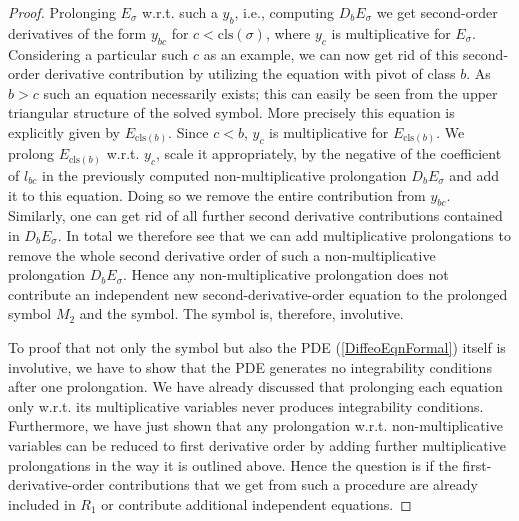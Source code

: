 \begin{proof}
Prolonging $E_{\sigma}$ w.r.t. such a $y_b$, i.e., computing $D_bE_{\sigma}$ we get second-order derivatives of the form $y_{bc}$ for $c < \mathrm{cls}(\sigma)$, where $y_c$ is multiplicative for $E_{\sigma}$. Considering a particular such $c$ as an example, we can now get rid of this second-order derivative contribution by utilizing the equation with pivot of class $b$. As $b>c$ such an equation necessarily exists; this can easily be seen from the upper triangular structure of the solved symbol. More precisely this equation is explicitly given by $E_{\mathrm{cls}(b)}$.
Since $c<b$, $y_c$ is multiplicative for $E_{\mathrm{cls}(b)}$. We prolong $E_{\mathrm{cls}(b)}$ w.r.t. $y_c$, scale it appropriately, by the negative of the coefficient of $l_{bc}$ in the previously computed non-multiplicative prolongation $D_bE_{\sigma}$ and add it to this equation. Doing so we remove the entire contribution from $y_{bc}$. Similarly, one can get rid of all further second derivative contributions contained in $D_bE_{\sigma}$. In total we therefore see that we can add multiplicative prolongations to remove the whole second derivative order of such a non-multiplicative prolongation $D_bE_{\sigma}$.
Hence any non-multiplicative prolongation does not contribute an independent new second-derivative-order equation to the prolonged symbol $M_2$ and the symbol. The symbol is, therefore, involutive. 

To proof that not only the symbol but also the PDE (\ref{DiffeoEqnFormal}) itself is involutive, we have to show that the PDE generates no integrability conditions after one prolongation. We have already discussed that prolonging each equation only w.r.t. its multiplicative variables never produces integrability conditions. Furthermore, we have just shown that any prolongation w.r.t. non-multiplicative variables can be reduced to first derivative order by adding further multiplicative prolongations in the way it is outlined above. Hence the question is if the first-derivative-order contributions that we get from such a procedure are already included in $R_1$ or contribute additional independent equations. 


\end{proof}
